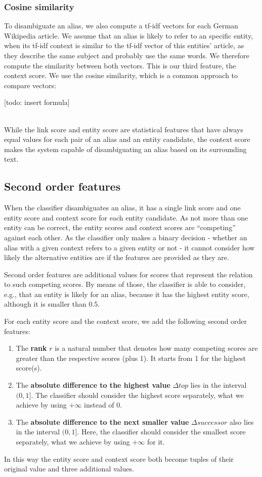 \subsubsection{Cosine similarity}
To disambiguate an alias, we also compute a tf-idf vectors for each German Wikipedia article. We assume that an alias is likely to refer to an specific entity, when its tf-idf context is similar to the tf-idf vector of this entities' article, as they describe the same subject and probably use the same words. We therefore compute the similarity between both vectors. This is our third feature, the context score. We use the cosine similarity, which is a common approach to compare vectors:

[todo: insert formula]

~\\
While the link score and entity score are statistical features that have always equal values for each pair of an alias and an entity candidate, the context score makes the system capable of disambiguating an alias based on its surrounding text.



\subsection{Second order features}
When the classifier disambiguates an alias, it has a single link score and one entity score and context score for each entity candidate. As not more than one entity can be correct, the entity scores and context scores are "`competing"' against each other. As the classifier only makes a binary decision - whether an alias with a given context refers to a given entity or not - it cannot consider how likely the alternative entities are if the features are provided as they are.

Second order features are additional values for scores that represent the relation to such competing scores. By means of those, the classifier is able to consider, e.g., that an entity is likely for an alias, because it has the highest entity score, although it is smaller than 0.5.

For each entity score and the context score, we add the following second order features:

\begin{enumerate}
\item The \textbf{rank} $r$ is a natural number that denotes how many competing scores are greater than the respective scores (plus 1). It starts from 1 for the highest score(s).

\item The \textbf{absolute difference to the highest value} $\Delta top$ lies in the interval $(0, 1]$. The classifier should consider the highest score separately, what we achieve by using $+\infty$ instead of 0.

\item The \textbf{absolute difference to the next smaller value} $\Delta successor$ also lies in the interval $(0, 1]$. Here, the classifier should consider the smallest score separately, what we achieve by using $+\infty$ for it.
\end{enumerate}

In this way the entity score and context score both become tuples of their original value and three additional values.